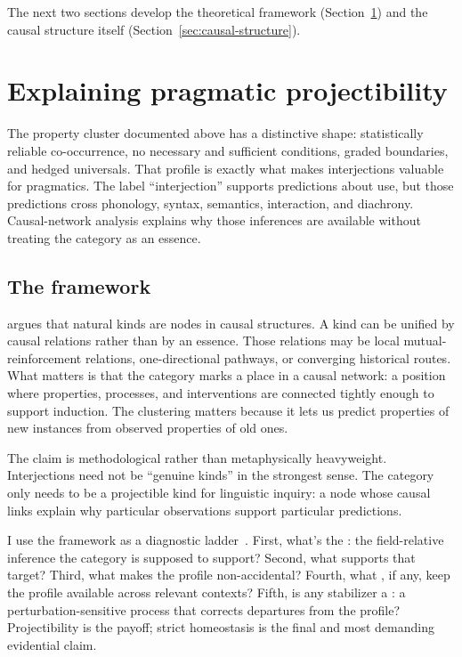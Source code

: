 \documentclass[12pt]{article}
\newif\ifblind
\begin{document}
The next two sections develop the theoretical framework
(Section~\ref{sec:causal-framework}) and the causal structure itself
(Section~\ref{sec:causal-structure}).

\section[Pragmatic projectibility]{Explaining pragmatic projectibility}\label{sec:causal-framework}

The property cluster documented above has a distinctive shape:
statistically reliable co-occurrence, no necessary and sufficient
conditions, graded boundaries, and hedged universals. That profile is
exactly what makes interjections valuable for pragmatics. The label
\enquote{interjection} supports predictions about use, but those
predictions cross phonology, syntax, semantics, interaction, and
diachrony. Causal-network analysis explains why those inferences are
available without treating the category as an essence.

\subsection{The framework}

\textcite{khalidi2013,khalidi2018nodes} argues that natural kinds are
nodes in causal structures. A kind can be unified by causal relations
rather than by an essence. Those relations may be local
mutual-reinforcement relations, one-directional pathways, or converging
historical routes. What matters is that the category marks a place in a
causal network: a position where properties, processes, and
interventions are connected tightly enough to support induction. The
clustering matters because it lets us predict properties of new
instances from observed properties of old ones.

The claim is methodological rather than metaphysically heavyweight.
Interjections need not be \enquote{genuine kinds} in the strongest
sense. The category only needs to be a projectible kind for linguistic
inquiry: a node whose causal links explain why particular observations
support particular predictions.

I use the framework as a diagnostic ladder\ifblind\else\
\citep{reynolds2026notEveryStableCluster}\fi. First, what's the
: the field-relative inference the category is
supposed to support? Second, what \term{stable profile} supports that
target? Third, what \term{network order} makes the profile
non-accidental? Fourth, what , if any, keep the
profile available across relevant contexts? Fifth, is any stabilizer a
\term{controller}: a perturbation-sensitive process that corrects
departures from the profile? Projectibility is the payoff; strict
homeostasis is the final and most demanding evidential claim.
\end{document}
